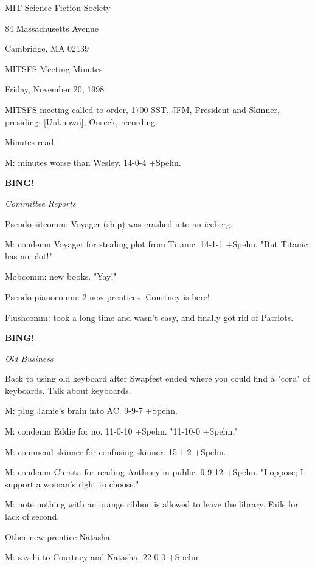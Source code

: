\documentclass[12pt]{article}
\newcommand{\bing}{{\bf BING!} }
\newcommand{\goto}[1]{\bing \vskip 12pt \centerline{{\em{#1}}}}
\begin{document}
\begin{center}

MIT Science Fiction Society 

84 Massachusetts Avenue

Cambridge, MA 02139

\vspace{12pt}

MITSFS Meeting Minutes 

Friday, November 20, 1998

\end{center}
 
\vspace{18pt}

\setlength{\parskip}{6pt}

\noindent
MITSFS meeting called to order, 1700 SST,
JFM, President and Skinner, presiding; [Unknown], Onseck, recording.

Minutes read.

M: minutes worse than Wesley. 14-0-4 +Spehn.

\goto{Committee Reports}

Pseudo-sitcomm: Voyager (ship) was crashed into an iceberg.

M: condemn Voyager for stealing plot from Titanic. 14-1-1 +Spehn. "But Titanic has no plot!"

Mobcomm: new books. "Yay!"

Pseudo-pianocomm: 2 new prentices- Courtney is here!

Flushcomm: took a long time and wasn't easy, and finally got rid of Patriots.

\goto{Old Business}

Back to using old keyboard after Swapfest ended where you could find a "cord" of keyboards. Talk about keyboards.

M: plug Jamie's brain into AC. 9-9-7 +Spehn.

M: condemn Eddie for no. 11-0-10 +Spehn. "11-10-0 +Spehn."

M: commend skinner for confusing skinner. 15-1-2 +Spehn.

M: condemn Christa for reading Anthony in public. 9-9-12 +Spehn. "I oppose; I support a woman's right to choose."

M: note nothing with an orange ribbon is allowed to leave the library. Fails for lack of second.

Other new prentice Natasha.

M: say hi to Courtney and Natasha. 22-0-0 +Spehn.
\end{document}
